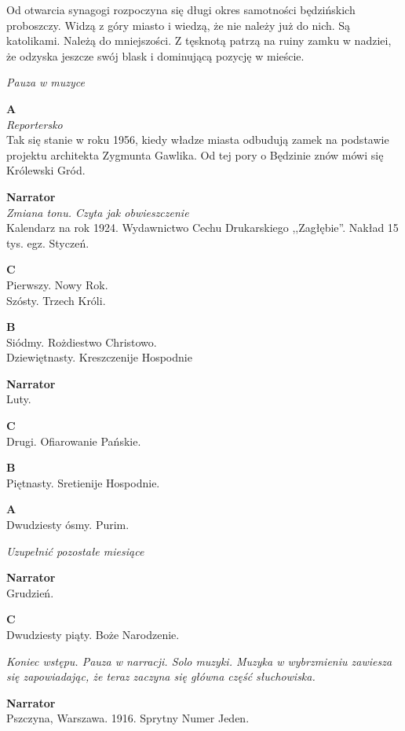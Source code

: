 \documentclass[11pt,a4paper,oneside]{article}
\begin{document}
Od otwarcia synagogi rozpoczyna się długi okres samotności będzińskich
proboszczy. Widzą z góry miasto i wiedzą, że nie należy już do nich.
Są katolikami. Należą do mniejszości. Z tęsknotą patrzą na ruiny zamku w nadziei,
że odzyska jeszcze swój blask i dominującą pozycję w mieście. 

{\color{light-gray} \emph{Pauza w muzyce}}

\textbf{A}\\
{\color{light-gray} \emph{Reportersko}}\\
Tak się stanie w roku 1956, kiedy władze miasta odbudują zamek na podstawie
projektu architekta Zygmunta Gawlika. Od tej pory o Będzinie znów mówi się
Królewski Gród.

\textbf{Narrator}\\
{\color{light-gray} \emph{Zmiana tonu. Czyta jak obwieszczenie}}\\
Kalendarz na rok 1924. Wydawnictwo Cechu Drukarskiego
,,Zagłębie''. Nakład 15 tys. egz. Styczeń.

\textbf{C}\\
Pierwszy. Nowy Rok. \\
Szósty. Trzech Króli.

\textbf{B}\\
Siódmy. Rożdiestwo Christowo. \\
Dziewiętnasty. Kreszczenije Hospodnie

\textbf{Narrator}\\
Luty.

\textbf{C}\\
Drugi. Ofiarowanie Pańskie.

\textbf{B}\\
Piętnasty. Sretienije Hospodnie.

\textbf{A}\\
Dwudziesty ósmy. Purim.

{\color{red} \emph{Uzupełnić pozostałe miesiące}}

\textbf{Narrator}\\
Grudzień.

\textbf{C}\\
Dwudziesty piąty. Boże Narodzenie.

{\color{light-gray} \emph{Koniec wstępu. Pauza w narracji. Solo
muzyki. Muzyka w wybrzmieniu zawiesza się zapowiadając, że teraz
zaczyna się główna część słuchowiska.}}

\textbf{Narrator}\\
Pszczyna, Warszawa. 1916. Sprytny Numer Jeden. 
\end{document}
